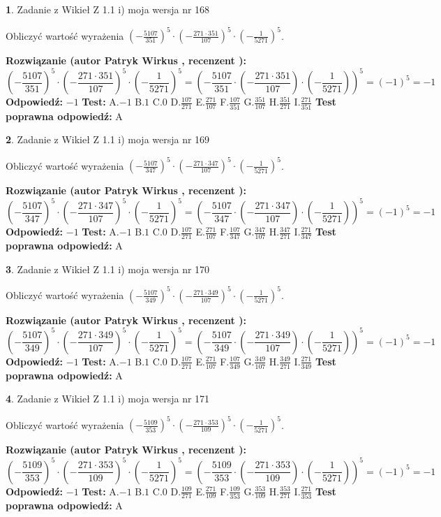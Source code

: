 \documentclass[12pt, a4paper]{article}
\theoremstyle{definition} %
\newtheorem{zad}{}
\newcommand{\zadStart}[1]{\begin{zad}#1\newline}
\newcommand{\zadStop}{\end{zad}}
\newcommand{\rozwStart}[2]{\noindent \textbf{Rozwiązanie (autor #1 , recenzent #2): }\newline}
\newcommand{\rozwStop}{\newline}
\newcommand{\odpStart}{\noindent \textbf{Odpowiedź:}\newline}
\newcommand{\odpStop}{\newline}
\newcommand{\testStart}{\noindent \textbf{Test:}\newline}
\newcommand{\testStop}{\newline}
\newcommand{\kluczStart}{\noindent \textbf{Test poprawna odpowiedź:}\newline}
\newcommand{\kluczStop}{\newline}
\begin{document}
\zadStart{Zadanie z Wikieł Z 1.1 i) moja wersja nr 168}

Obliczyć wartość wyrażenia $(-\frac{5107}{351})^{5} \cdot (-\frac{271 \cdot 351}{107})^{5} \cdot (-\frac{1}{5271})^{5}$.
\zadStop
\rozwStart{Patryk Wirkus}{}
$$(-\frac{5107}{351})^{5} \cdot (-\frac{271 \cdot 351}{107})^{5} \cdot (-\frac{1}{5271})^{5} = (-\frac{5107}{351} \cdot (-\frac{271 \cdot 351}{107}) \cdot (-\frac{1}{5271}))^{5} = (-1)^{5} = -1$$
\rozwStop
\odpStart
$-1$
\odpStop
\testStart
A.$-1$ B.$1$ C.$0$ D.$\frac{107}{271}$ E.$\frac{271}{107}$
F.$\frac{107}{351}$ G.$\frac{351}{107}$
H.$\frac{351}{271}$
I.$\frac{271}{351}$
\testStop
\kluczStart
A
\kluczStop



\zadStart{Zadanie z Wikieł Z 1.1 i) moja wersja nr 169}

Obliczyć wartość wyrażenia $(-\frac{5107}{347})^{5} \cdot (-\frac{271 \cdot 347}{107})^{5} \cdot (-\frac{1}{5271})^{5}$.
\zadStop
\rozwStart{Patryk Wirkus}{}
$$(-\frac{5107}{347})^{5} \cdot (-\frac{271 \cdot 347}{107})^{5} \cdot (-\frac{1}{5271})^{5} = (-\frac{5107}{347} \cdot (-\frac{271 \cdot 347}{107}) \cdot (-\frac{1}{5271}))^{5} = (-1)^{5} = -1$$
\rozwStop
\odpStart
$-1$
\odpStop
\testStart
A.$-1$ B.$1$ C.$0$ D.$\frac{107}{271}$ E.$\frac{271}{107}$
F.$\frac{107}{347}$ G.$\frac{347}{107}$
H.$\frac{347}{271}$
I.$\frac{271}{347}$
\testStop
\kluczStart
A
\kluczStop



\zadStart{Zadanie z Wikieł Z 1.1 i) moja wersja nr 170}

Obliczyć wartość wyrażenia $(-\frac{5107}{349})^{5} \cdot (-\frac{271 \cdot 349}{107})^{5} \cdot (-\frac{1}{5271})^{5}$.
\zadStop
\rozwStart{Patryk Wirkus}{}
$$(-\frac{5107}{349})^{5} \cdot (-\frac{271 \cdot 349}{107})^{5} \cdot (-\frac{1}{5271})^{5} = (-\frac{5107}{349} \cdot (-\frac{271 \cdot 349}{107}) \cdot (-\frac{1}{5271}))^{5} = (-1)^{5} = -1$$
\rozwStop
\odpStart
$-1$
\odpStop
\testStart
A.$-1$ B.$1$ C.$0$ D.$\frac{107}{271}$ E.$\frac{271}{107}$
F.$\frac{107}{349}$ G.$\frac{349}{107}$
H.$\frac{349}{271}$
I.$\frac{271}{349}$
\testStop
\kluczStart
A
\kluczStop



\zadStart{Zadanie z Wikieł Z 1.1 i) moja wersja nr 171}

Obliczyć wartość wyrażenia $(-\frac{5109}{353})^{5} \cdot (-\frac{271 \cdot 353}{109})^{5} \cdot (-\frac{1}{5271})^{5}$.
\zadStop
\rozwStart{Patryk Wirkus}{}
$$(-\frac{5109}{353})^{5} \cdot (-\frac{271 \cdot 353}{109})^{5} \cdot (-\frac{1}{5271})^{5} = (-\frac{5109}{353} \cdot (-\frac{271 \cdot 353}{109}) \cdot (-\frac{1}{5271}))^{5} = (-1)^{5} = -1$$
\rozwStop
\odpStart
$-1$
\odpStop
\testStart
A.$-1$ B.$1$ C.$0$ D.$\frac{109}{271}$ E.$\frac{271}{109}$
F.$\frac{109}{353}$ G.$\frac{353}{109}$
H.$\frac{353}{271}$
I.$\frac{271}{353}$
\testStop
\kluczStart
A
\kluczStop
\end{document}

